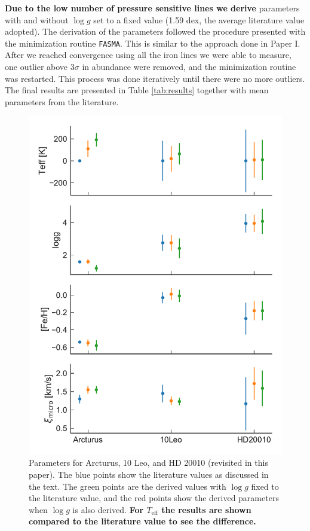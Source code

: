 \documentclass{aa}
\begin{document}
{\bf Due to the low number of pressure sensitive  lines we derive} parameters with and
without $\log g$ set to a fixed value (1.59 dex, the average literature value adopted). The
derivation of the parameters followed the procedure presented \citet{Andreasen2017a} with the
minimization routine \texttt{FASMA}. This is similar to the approach done in Paper I. After we
reached convergence using all the iron lines we were able to measure, one outlier above $3\sigma$ in
abundance were removed, and the minimization routine was restarted. This process was done
iteratively until there were no more outliers. The final results are presented in Table
\ref{tab:results} together with mean parameters from the literature.


\begin{figure}[htpb!]
    \centering
    \includegraphics[width=1.0\linewidth]{figures/parameters.pdf}
    \caption{Parameters for Arcturus, 10 Leo, and HD 20010 (revisited in this paper). The blue
             points show the literature values as discussed in the text. The green points are the
             derived values with $\log g$ fixed to the literature value, and the red points show the
             derived parameters when $\log g$ is also derived. {\bf For $T_\mathrm{eff}$ the results
             are shown compared to the literature value to see the difference.}}
    \label{fig:parameters}
\end{figure}
\end{document}
